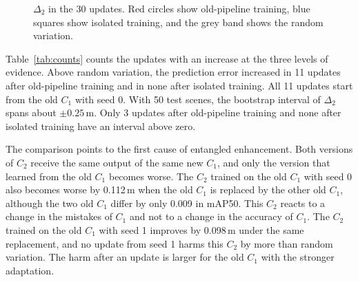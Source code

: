 \documentclass[conference]{IEEEtran}
\begin{document}
\begin{figure}[t]
\centering
{}
\caption{$\Delta_2$ in the 30 updates. Red circles show old-pipeline training, blue squares show isolated training, and the grey band shows the random variation.}
\label{fig:delta2}
\end{figure}

Table~\ref{tab:counts} counts the updates with an increase at the three levels
of evidence. Above random variation, the prediction error increased in 11 updates after old-pipeline training and in none after isolated training. All 11 updates start from the old $C_1$ with seed 0. With 50 test scenes, the bootstrap interval of $\Delta_2$ spans about $\pm 0.25$\,m. Only 3 updates after old-pipeline training and none after isolated training have an interval above zero.

The comparison points to the first cause of entangled enhancement. Both versions of $C_2$ receive the same output of the same new $C_1$, and only the version that learned from the old $C_1$ becomes worse. The $C_2$ trained on the old $C_1$ with seed 0 also becomes worse by 0.112\,m when the old $C_1$ is replaced by the other old $C_1$, although the two old $C_1$ differ by only 0.009 in mAP50. This $C_2$ reacts to a change in the mistakes of $C_1$ and not to a change in the accuracy of $C_1$. The $C_2$ trained on the old $C_1$ with seed 1 improves by 0.098\,m under the same replacement, and no update from seed 1 harms this $C_2$ by more than random variation. The harm after an update is larger for the old $C_1$ with the stronger adaptation.
\end{document}
